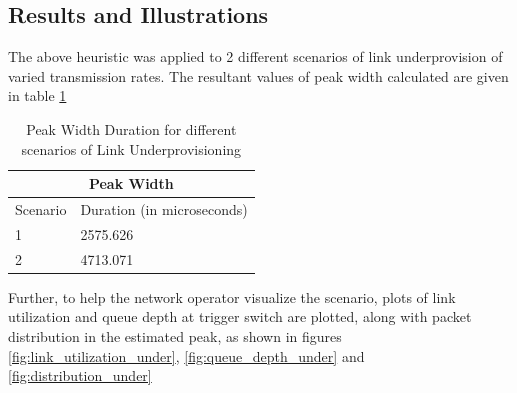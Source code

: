\subsection{Results and Illustrations}
The above heuristic was applied to 2 different scenarios of link underprovision of varied transmission rates.
The resultant values of peak width calculated are given in table \ref{tab:Peak_Width}
\begin{table}[h]
\begin{center}
\begin{tabular}{ |p{3cm}|p{5cm}|  }
	\hline
	\multicolumn{2}{|c|}{Peak Width} \\
	\hline
	Scenario & Duration (in microseconds) \\
	\hline
	1 & 2575.626 \\
	2 & 4713.071 \\
	\hline
   \end{tabular}
\end{center}

\caption{Peak Width Duration for different scenarios of Link Underprovisioning}
\label{tab:Peak_Width}
\end{table}

Further, to help the network operator visualize the scenario, plots of link utilization and queue depth at 
trigger switch are plotted, along with packet distribution in the estimated peak, as shown in figures \ref{fig:link_utilization_under}, \ref{fig:queue_depth_under}
and \ref{fig:distribution_under}

